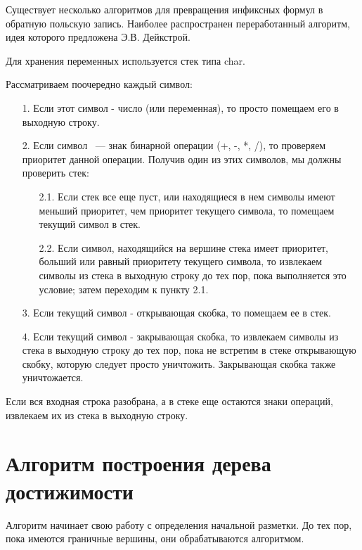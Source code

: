 Существует несколько алгоритмов для превращения инфиксных формул в обратную польскую запись. Наиболее распространен переработанный алгоритм, идея которого предложена Э.В. Дейкстрой.

Для хранения переменных используется стек типа char.

Рассматриваем поочередно каждый символ:
\begin{enumerate}
\item[1.] Если этот символ - число (или переменная), то просто помещаем его в выходную строку.
\item[2.] Если символ ~--- знак бинарной операции (+, -, *, /), то проверяем приоритет данной операции. Получив один из этих символов, мы должны проверить стек:
\begin{enumerate}
\item[2.1.] Если стек все еще пуст, или находящиеся в нем символы имеют меньший приоритет, чем приоритет текущего символа, то помещаем текущий символ в стек.
\item[2.2.] Если символ, находящийся на вершине стека имеет приоритет, больший или равный приоритету текущего символа, то извлекаем символы из стека в выходную строку до тех пор, пока выполняется это условие; затем переходим к пункту 2.1.
\end{enumerate}
\item[3.] Если текущий символ - открывающая скобка, то помещаем ее в стек.
\item[4.] Если текущий символ - закрывающая скобка, то извлекаем символы из стека в выходную строку до тех пор, пока не встретим в стеке открывающую скобку, которую следует просто уничтожить. Закрывающая скобка также уничтожается.
\end{enumerate}

Если вся входная строка разобрана, а в стеке еще остаются знаки операций, извлекаем их из стека в выходную строку.

\section{Алгоритм построения дерева достижимости}

Алгоритм начинает свою работу с определения начальной разметки. До тех пор, пока имеются граничные вершины, они обрабатываются алгоритмом.

